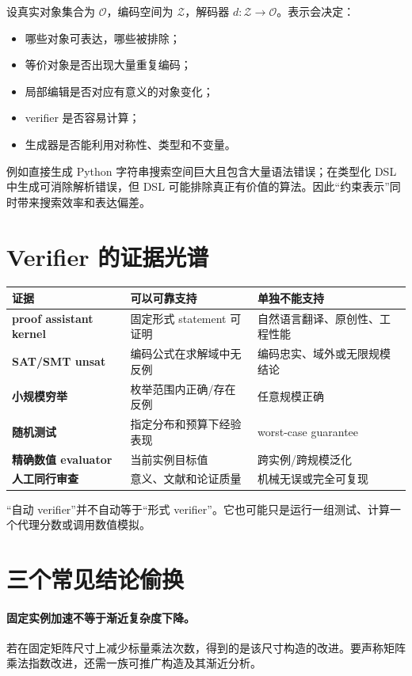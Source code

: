 设真实对象集合为 $\mathcal O$，编码空间为 $\mathcal Z$，解码器 $d:\mathcal Z\to\mathcal O$。表示会决定：
\begin{itemize}
  \item 哪些对象可表达，哪些被排除；
  \item 等价对象是否出现大量重复编码；
  \item 局部编辑是否对应有意义的对象变化；
  \item verifier 是否容易计算；
  \item 生成器是否能利用对称性、类型和不变量。
\end{itemize}

例如直接生成 Python 字符串搜索空间巨大且包含大量语法错误；在类型化 DSL 中生成可消除解析错误，但 DSL 可能排除真正有价值的算法。因此“约束表示”同时带来搜索效率和表达偏差。

\section{Verifier 的证据光谱}

\begin{center}
\begin{tabularx}{0.96\textwidth}{>{\bfseries}lX X}
\toprule
证据 & 可以可靠支持 & 单独不能支持 \\
\midrule
proof assistant kernel & 固定形式 statement 可证明 & 自然语言翻译、原创性、工程性能 \\
SAT/SMT unsat & 编码公式在求解域中无反例 & 编码忠实、域外或无限规模结论 \\
小规模穷举 & 枚举范围内正确/存在反例 & 任意规模正确 \\
随机测试 & 指定分布和预算下经验表现 & worst-case guarantee \\
精确数值 evaluator & 当前实例目标值 & 跨实例/跨规模泛化 \\
人工同行审查 & 意义、文献和论证质量 & 机械无误或完全可复现 \\
\bottomrule
\end{tabularx}
\end{center}

“自动 verifier”并不自动等于“形式 verifier”。它也可能只是运行一组测试、计算一个代理分数或调用数值模拟。

\section{三个常见结论偷换}

\paragraph{固定实例加速不等于渐近复杂度下降。}
若在固定矩阵尺寸上减少标量乘法次数，得到的是该尺寸构造的改进。要声称矩阵乘法指数改进，还需一族可推广构造及其渐近分析。

